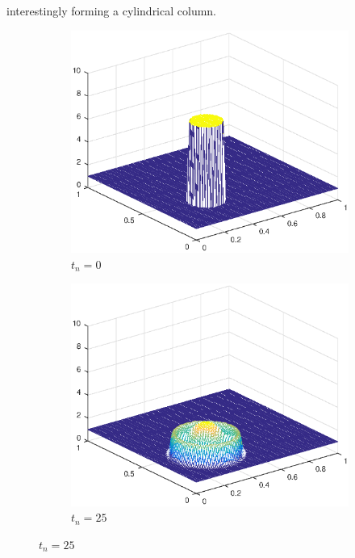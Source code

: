 interestingly forming a cylindrical column.
\begin{figure}[h!]
    \centering
    \begin{subfigure}[t]{0.4\textwidth}
        \centering
        \includegraphics[width=\textwidth]{images/sol_ri_0000_per.eps}
        \caption{$t_{n}=0$}
        \label{fig:0}
    \end{subfigure}
    \begin{subfigure}[t]{0.48\textwidth}
        \centering
        \includegraphics[width=\textwidth]{images/sol_ri_0025_per.eps}
        \caption{$t_{n}=25$}
        \label{fig:10}
    \end{subfigure}

\end{figure}
